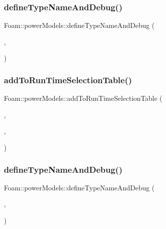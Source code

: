 \subsubsection{\texorpdfstring{define\+Type\+Name\+And\+Debug()}{defineTypeNameAndDebug()}\hspace{0.1cm}{\footnotesize\ttfamily [3/5]}}
{\footnotesize\ttfamily Foam\+::power\+Models\+::define\+Type\+Name\+And\+Debug (\begin{DoxyParamCaption}\item[{\hyperlink{classFoam_1_1powerModels_1_1heatedPin}{heated\+Pin}}]{,  }\item[{0}]{ }\end{DoxyParamCaption})}

\mbox{\label{namespaceFoam_1_1powerModels_a44578ffaf1407ce6f5144541c5ab0f9f}} 
\subsubsection{\texorpdfstring{add\+To\+Run\+Time\+Selection\+Table()}{addToRunTimeSelectionTable()}\hspace{0.1cm}{\footnotesize\ttfamily [3/5]}}
{\footnotesize\ttfamily Foam\+::power\+Models\+::add\+To\+Run\+Time\+Selection\+Table (\begin{DoxyParamCaption}\item[{\hyperlink{classFoam_1_1powerModel}{power\+Model}}]{,  }\item[{\hyperlink{classFoam_1_1powerModels_1_1heatedPin}{heated\+Pin}}]{,  }\item[{power\+Models}]{ }\end{DoxyParamCaption})}

\mbox{\label{namespaceFoam_1_1powerModels_ac9e561a2a6665dc8cffe73772ae18819}} 
\subsubsection{\texorpdfstring{define\+Type\+Name\+And\+Debug()}{defineTypeNameAndDebug()}\hspace{0.1cm}{\footnotesize\ttfamily [4/5]}}
{\footnotesize\ttfamily Foam\+::power\+Models\+::define\+Type\+Name\+And\+Debug (\begin{DoxyParamCaption}\item[{\hyperlink{classFoam_1_1powerModels_1_1nuclearFuelPin}{nuclear\+Fuel\+Pin}}]{,  }\item[{0}]{ }\end{DoxyParamCaption})}

